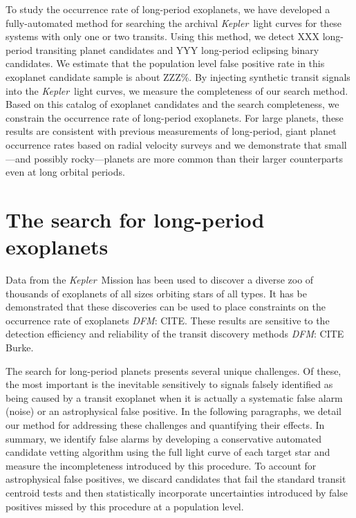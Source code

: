 \documentclass[preprint]{aastex}
\newcommand{\project}[1]{\textsl{#1}}
\newcommand{\kepler}{\project{Kepler}}
\newcommand{\todo}[3]{{\color{#2}\emph{#1}: #3}}
\newcommand{\dfmtodo}[1]{\todo{DFM}{red}{#1}}
\begin{document}
To study the occurrence rate of long-period exoplanets, we have developed a
fully-automated method for searching the archival \kepler\ light curves for
these systems with only one or two transits.
Using this method, we detect XXX long-period transiting planet candidates and
YYY long-period eclipsing binary candidates.
We estimate that the population level false positive rate in this exoplanet
candidate sample is about ZZZ\%.
By injecting synthetic transit signals into the \kepler\ light curves, we
measure the completeness of our search method.
Based on this catalog of exoplanet candidates and the search completeness, we
constrain the occurrence rate of long-period exoplanets.
For large planets, these results are consistent with previous measurements of
long-period, giant planet occurrence rates based on radial velocity surveys
and we demonstrate that small---and possibly rocky---planets are more common
than their larger counterparts even at long orbital periods.

\section{The search for long-period exoplanets}

Data from the \kepler\ Mission has been used to discover a diverse zoo of
thousands of exoplanets of all sizes orbiting stars of all types.
It has be demonstrated that these discoveries can be used to place constraints
on the occurrence rate of exoplanets \dfmtodo{CITE}.
These results are sensitive to the detection efficiency and reliability of the
transit discovery methods \dfmtodo{CITE Burke}.

The search for long-period planets presents several unique challenges.
Of these, the most important is the inevitable sensitively to signals falsely
identified as being caused by a transit exoplanet when it is actually a
systematic false alarm (noise) or an astrophysical false positive.
In the following paragraphs, we detail our method for addressing these
challenges and quantifying their effects.
In summary, we identify false alarms by developing a conservative automated
candidate vetting algorithm using the full light curve of each target star and
measure the incompleteness introduced by this procedure.
To account for astrophysical false positives, we discard candidates that fail
the standard transit centroid tests and then statistically incorporate
uncertainties introduced by false positives missed by this procedure at a
population level.
\end{document}
